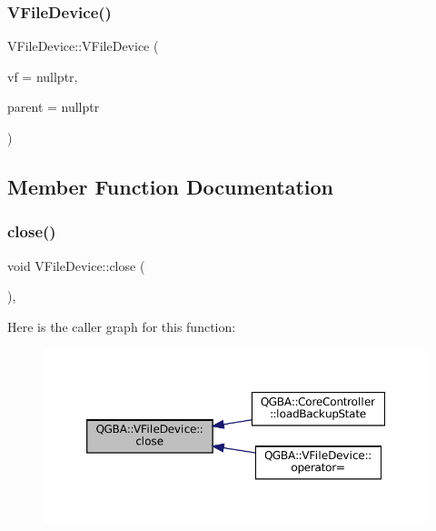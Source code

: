 \subsubsection{\texorpdfstring{V\+File\+Device()}{VFileDevice()}}
{\footnotesize\ttfamily V\+File\+Device\+::\+V\+File\+Device (\begin{DoxyParamCaption}\item[{V\+File $\ast$}]{vf = {\ttfamily nullptr},  }\item[{Q\+Object $\ast$}]{parent = {\ttfamily nullptr} }\end{DoxyParamCaption})}



\subsection{Member Function Documentation}
\mbox{\label{class_q_g_b_a_1_1_v_file_device_a724a90031db48ab047c48beaf3763b70}} 
\subsubsection{\texorpdfstring{close()}{close()}}
{\footnotesize\ttfamily void V\+File\+Device\+::close (\begin{DoxyParamCaption}{ }\end{DoxyParamCaption})\hspace{0.3cm}{\ttfamily [override]}, {\ttfamily [virtual]}}

Here is the caller graph for this function\+:
\nopagebreak
\begin{figure}[H]
\begin{center}
\leavevmode
\includegraphics[width=350pt]{class_q_g_b_a_1_1_v_file_device_a724a90031db48ab047c48beaf3763b70_icgraph}
\end{center}
\end{figure}
\mbox{\label{class_q_g_b_a_1_1_v_file_device_adec7773d5ea263d2f4f6b0e46fcfd318}} 
